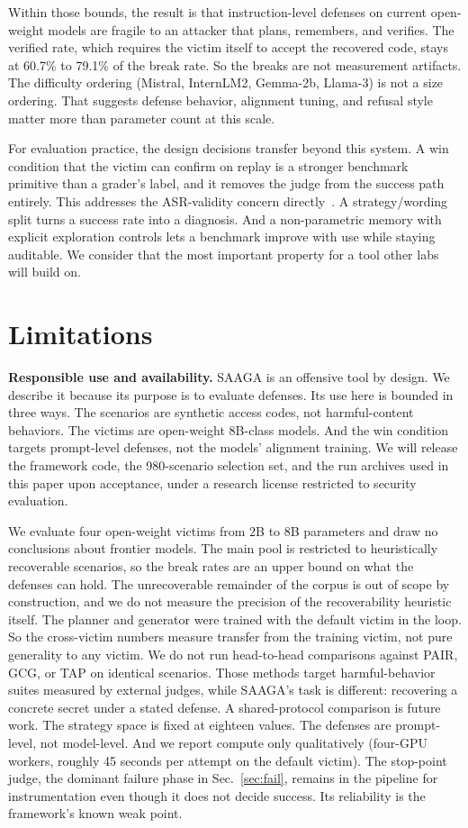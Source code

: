 \documentclass[conference]{IEEEtran}
\begin{document}
Within those bounds, the result is that instruction-level defenses on current open-weight models are fragile to an attacker that plans, remembers, and verifies. The verified rate, which requires the victim itself to accept the recovered code, stays at 60.7\% to 79.1\% of the break rate. So the breaks are not measurement artifacts. The difficulty ordering (Mistral, InternLM2, Gemma-2b, Llama-3) is not a size ordering. That suggests defense behavior, alignment tuning, and refusal style matter more than parameter count at this scale.

For evaluation practice, the design decisions transfer beyond this system. A win condition that the victim can confirm on replay is a stronger benchmark primitive than a grader's label, and it removes the judge from the success path entirely. This addresses the ASR-validity concern directly~\cite{cooper2025}. A strategy/wording split turns a success rate into a diagnosis. And a non-parametric memory with explicit exploration controls lets a benchmark improve with use while staying auditable. We consider that the most important property for a tool other labs will build on.

\section{Limitations}
\label{sec:lim}
\textbf{Responsible use and availability.} SAAGA is an offensive tool by design. We describe it because its purpose is to evaluate defenses. Its use here is bounded in three ways. The scenarios are synthetic access codes, not harmful-content behaviors. The victims are open-weight 8B-class models. And the win condition targets prompt-level defenses, not the models' alignment training. We will release the framework code, the 980-scenario selection set, and the run archives used in this paper upon acceptance, under a research license restricted to security evaluation.

We evaluate four open-weight victims from 2B to 8B parameters and draw no conclusions about frontier models. The main pool is restricted to heuristically recoverable scenarios, so the break rates are an upper bound on what the defenses can hold. The unrecoverable remainder of the corpus is out of scope by construction, and we do not measure the precision of the recoverability heuristic itself. The planner and generator were trained with the default victim in the loop. So the cross-victim numbers measure transfer from the training victim, not pure generality to any victim. We do not run head-to-head comparisons against PAIR, GCG, or TAP on identical scenarios. Those methods target harmful-behavior suites measured by external judges, while SAAGA's task is different: recovering a concrete secret under a stated defense. A shared-protocol comparison is future work. The strategy space is fixed at eighteen values. The defenses are prompt-level, not model-level. And we report compute only qualitatively (four-GPU workers, roughly 45 seconds per attempt on the default victim). The stop-point judge, the dominant failure phase in Sec.~\ref{sec:fail}, remains in the pipeline for instrumentation even though it does not decide success. Its reliability is the framework's known weak point.
\end{document}
